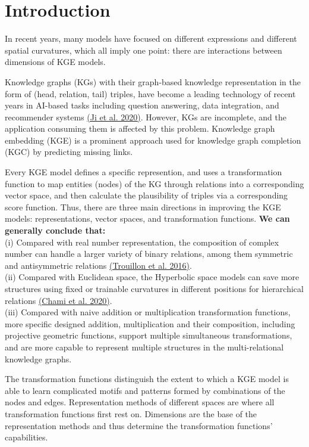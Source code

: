 \documentclass[9pt]{ctexart}
\theoremstyle{definition}
\begin{document}
\section{Introduction}
In recent years, many models have focused on different expressions and different spatial curvatures, which all imply one point: there are interactions between dimensions of KGE models.

Knowledge graphs (KGs) with their graph-based knowledge representation in the form of (head, relation, tail) triples, have become a leading technology of recent years in AI-based tasks including question answering, data integration, and recommender systems 
\hyperlink{JiS20}{(Ji et al. 2020)}. 
However, KGs are incomplete, and the application consuming them is affected by this problem.
Knowledge graph embedding (KGE) is a prominent approach used for knowledge graph completion (KGC) by predicting missing links.

Every KGE model defines a specific represention, and uses a transformation function to map entities (nodes) of the KG through relations into a corresponding vector space, and then calculate the plausibility of triples via a corresponding score function.
Thus, there are three main directions in improving the KGE models: representations, vector spaces, and transformation functions.
\textbf{We can generally conclude that:}\\
(i) Compared with real number representation, the composition of complex number can handle a larger variety of binary relations, among them symmetric and antisymmetric relations
\hyperlink{Tro16}{(Trouillon et al. 2016)}.\\
(ii) Compared with Euclidean space, the Hyperbolic space models can save more structures using fixed or trainable curvatures in different positions for hierarchical relations
\hyperlink{Cha20}{(Chami et al. 2020)}.\\
(iii) Compared with naive addition or multiplication transformation functions, more specific designed addition, multiplication and their composition, including projective geometric functions, 
support multiple simultaneous transformations, and are more capable to represent multiple structures in the multi-relational knowledge graphs.

The transformation functions distinguish the extent to which a KGE model is able to learn complicated motifs and patterns formed by combinations of the nodes and edges.
Representation methods of different spaces are where all transformation functions first rest on.
Dimensions are the base of the representation methods and thus determine the transformation functions' capabilities.
\end{document}
